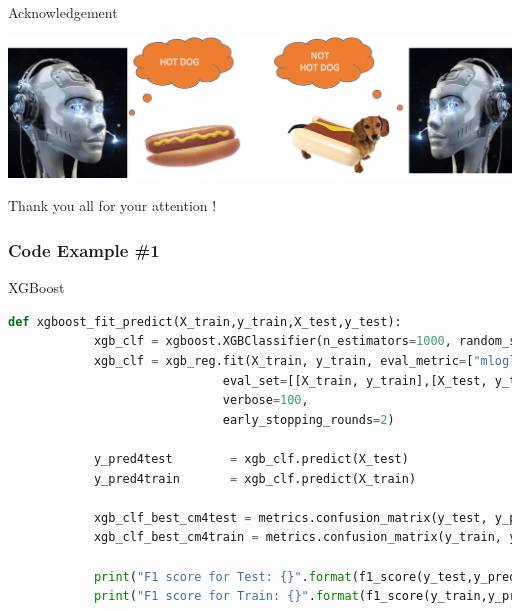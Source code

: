 \documentclass{if-beamer}
\begin{document}
  
\begin{frame}{Acknowledgement}    
 
   \centering \includegraphics[scale=0.3]{./figs/hotdog.png}
 

  \centering  \Huge Thank you all for your attention !
 
  \end{frame}




   

\begin{frame}[fragile]
\frametitle{Code Example \#1}


 \begin{exampleblock}{XGBoost}
 
      \begin{lstlisting}[language=Python]
      def xgboost_fit_predict(X_train,y_train,X_test,y_test):
            xgb_clf = xgboost.XGBClassifier(n_estimators=1000, random_state=42)
            xgb_clf = xgb_reg.fit(X_train, y_train, eval_metric=["mlogloss"],
                              eval_set=[[X_train, y_train],[X_test, y_test]],
                              verbose=100,
                              early_stopping_rounds=2)
             
            y_pred4test        = xgb_clf.predict(X_test)
            y_pred4train       = xgb_clf.predict(X_train)
            
            xgb_clf_best_cm4test = metrics.confusion_matrix(y_test, y_pred4test)
            xgb_clf_best_cm4train = metrics.confusion_matrix(y_train, y_pred4train)
            
            print("F1 score for Test: {}".format(f1_score(y_test,y_pred4test, average='weighted')))
            print("F1 score for Train: {}".format(f1_score(y_train,y_pred4train, average='weighted'))) 
            
      \end{lstlisting}
 \end{exampleblock}


\end{frame}
\end{document}
